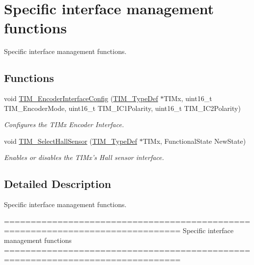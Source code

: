 \hypertarget{group___t_i_m___group8}{}\section{Specific interface management functions}
\label{group___t_i_m___group8}


Specific interface management functions.  


\subsection*{Functions}
\begin{DoxyCompactItemize}
\item 
void \hyperlink{group___t_i_m___group8_ga0fc7e76c47a3bd1ba1ebc71427832b51}{T\+I\+M\+\_\+\+Encoder\+Interface\+Config} (\hyperlink{struct_t_i_m___type_def}{T\+I\+M\+\_\+\+Type\+Def} $\ast$T\+I\+Mx, uint16\+\_\+t T\+I\+M\+\_\+\+Encoder\+Mode, uint16\+\_\+t T\+I\+M\+\_\+\+I\+C1\+Polarity, uint16\+\_\+t T\+I\+M\+\_\+\+I\+C2\+Polarity)
\begin{DoxyCompactList}\small\item\em Configures the T\+I\+Mx Encoder Interface. \end{DoxyCompactList}\item 
void \hyperlink{group___t_i_m___group8_ga42c2d1025a3937c9d9f38631af86ffa4}{T\+I\+M\+\_\+\+Select\+Hall\+Sensor} (\hyperlink{struct_t_i_m___type_def}{T\+I\+M\+\_\+\+Type\+Def} $\ast$T\+I\+Mx, Functional\+State New\+State)
\begin{DoxyCompactList}\small\item\em Enables or disables the T\+I\+Mx's Hall sensor interface. \end{DoxyCompactList}\end{DoxyCompactItemize}


\subsection{Detailed Description}
Specific interface management functions. 

\begin{DoxyVerb} ===============================================================================
                    Specific interface management functions
 ===============================================================================  \end{DoxyVerb}
 

